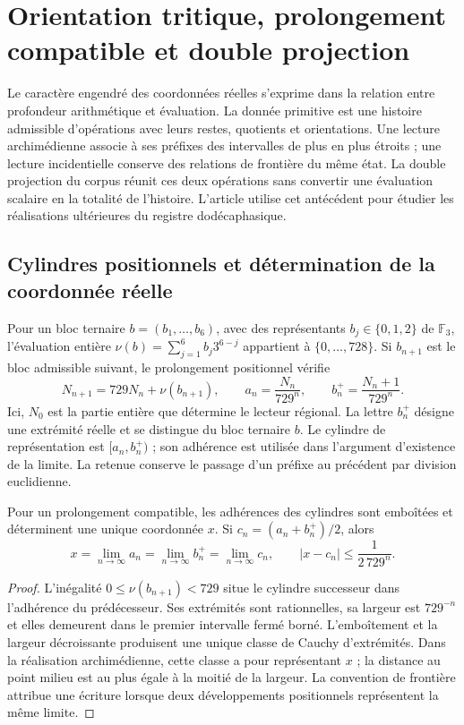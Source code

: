 \section{Orientation tritique, prolongement compatible et double projection}
\label{sec:trit-projection}

Le caractère engendré des coordonnées réelles s’exprime dans la relation
entre profondeur arithmétique et évaluation. La donnée primitive est une histoire
admissible d’opérations avec leurs restes, quotients et orientations. Une
lecture archimédienne associe à ses préfixes des intervalles de plus en plus étroits ;
une lecture incidentielle conserve des relations de frontière du même état.
La double projection du corpus \cite{hmtI,HMT-IX} réunit ces deux opérations
sans convertir une évaluation scalaire en la totalité de l’histoire.
L’article utilise cet antécédent pour étudier les réalisations ultérieures
du registre dodécaphasique.

\subsection{Cylindres positionnels et détermination de la coordonnée réelle}

Pour un bloc ternaire \(b=(b_1,\ldots,b_6)\), avec des représentants
\(b_j\in\{0,1,2\}\) de \(\mathbb F_3\), l’évaluation entière
\(\nu(b)=\sum_{j=1}^6b_j3^{6-j}\) appartient à
\(\{0,\ldots,728\}\). Si \(b_{n+1}\) est le bloc admissible suivant,
le prolongement positionnel vérifie
\[
 N_{n+1}=729N_n+\nu(b_{n+1}),\qquad
 a_n=\frac{N_n}{729^n},\qquad b_n^+=\frac{N_n+1}{729^n}.
\]
Ici, \(N_0\) est la partie entière que détermine le lecteur régional. La lettre \(b_n^+\) désigne une extrémité réelle et se distingue du bloc ternaire \(b\). Le cylindre de représentation est \([a_n,b_n^+)\) ; son adhérence est utilisée dans l'argument d'existence de la limite. La retenue conserve le passage d'un préfixe au précédent par division euclidienne.

\begin{proposition}
Pour un prolongement compatible, les adhérences des cylindres sont
emboîtées et déterminent une unique coordonnée \(x\). Si
\(c_n=(a_n+b_n^+)/2\), alors
\[
 x=\lim_{n\to\infty}a_n=\lim_{n\to\infty}b_n^+
 =\lim_{n\to\infty}c_n,\qquad
 |x-c_n|\leq\frac1{2\,729^n}.
\]
\end{proposition}
\begin{proof}
L'inégalité \(0\leq\nu(b_{n+1})<729\) situe le cylindre successeur dans l'adhérence du prédécesseur. Ses extrémités sont rationnelles, sa largeur est \(729^{-n}\) et elles demeurent dans le premier intervalle fermé borné. L'emboîtement et la largeur décroissante produisent une unique classe de Cauchy d'extrémités. Dans la réalisation archimédienne, cette classe a pour représentant \(x\) ; la distance au point milieu est au plus égale à la moitié de la largeur. La convention de frontière attribue une écriture lorsque deux développements positionnels représentent la même limite.
\end{proof}

